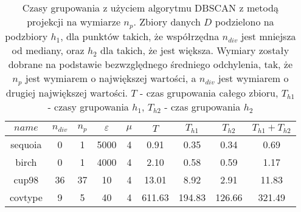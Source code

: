 \begin{table}
	\centering
	\begin{tabular}{ | c | c | c | c |  c | c | c | c | c | }
		\hline
		$ name $ & $ n_{div} $ & $ n_p $ & $ \varepsilon $ & $ \mu $ & $ T $ & $ T_{h1} $ & $ T_{h2} $ & $ T_{h1}+T_{h2} $\\ \hline
		 sequoia  & 0 & 1 & 5000 & 4 & 0.91 & 0.35 & 0.34 & 0.69 \\ \hline
		 birch  & 0 & 1 & 4000 & 4 & 2.10 & 0.58 & 0.59 & 1.17 \\ \hline
		 cup98  & 36 & 37 & 10 & 4 & 13.01 & 8.92 & 2.91 & 11.83 \\ \hline
		covtype & 9 & 5 & 40 & 4 & 611.63 & 194.83 & 126.66 & 321.49 \\ \hline
	\end{tabular}
	\caption{Czasy grupowania z użyciem algorytmu DBSCAN z metodą projekcji na wymiarze $ n_p $. Zbiory danych $ D $ podzielono na podzbiory $ h_1 $, dla punktów takich, że współrzędna $ n_{div} $ jest mniejsza od mediany, oraz $ h_2 $ dla takich, że jest większa. Wymiary zostały dobrane na podstawie bezwzględnego średniego odchylenia, tak, że $ n_p $ jest wymiarem o największej wartości, a $ n_{div} $ jest wymiarem o drugiej największej wartości. $ T $ - czas grupowania całego zbioru, $ T_{h1} $ - czasy grupowania $ h_1 $, $ T_{h2} $ - czas grupowania $ h_2 $}\label{qscan:projection-space-cut-times}
\end{table}